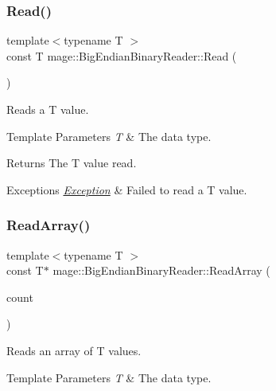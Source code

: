 \subsubsection{\texorpdfstring{Read()}{Read()}}
{\footnotesize\ttfamily template$<$typename T $>$ \\
const T mage\+::\+Big\+Endian\+Binary\+Reader\+::\+Read (\begin{DoxyParamCaption}{ }\end{DoxyParamCaption})\hspace{0.3cm}{\ttfamily [protected]}}

Reads a {\ttfamily T} value.


\begin{DoxyTemplParams}{Template Parameters}
{\em T} & The data type. \\
\hline
\end{DoxyTemplParams}
\begin{DoxyReturn}{Returns}
The {\ttfamily T} value read. 
\end{DoxyReturn}

\begin{DoxyExceptions}{Exceptions}
{\em \mbox{\hyperlink{classmage_1_1_exception}{Exception}}} & Failed to read a {\ttfamily T} value. \\
\hline
\end{DoxyExceptions}
\mbox{\label{classmage_1_1_big_endian_binary_reader_aaab7cf04eb19cc0fe535b9a619feaf21}} 
\subsubsection{\texorpdfstring{Read\+Array()}{ReadArray()}}
{\footnotesize\ttfamily template$<$typename T $>$ \\
const T$\ast$ mage\+::\+Big\+Endian\+Binary\+Reader\+::\+Read\+Array (\begin{DoxyParamCaption}\item[{size\+\_\+t}]{count }\end{DoxyParamCaption})\hspace{0.3cm}{\ttfamily [protected]}}

Reads an array of {\ttfamily T} values.


\begin{DoxyTemplParams}{Template Parameters}
{\em T} & The data type. \\
\hline
\end{DoxyTemplParams}

